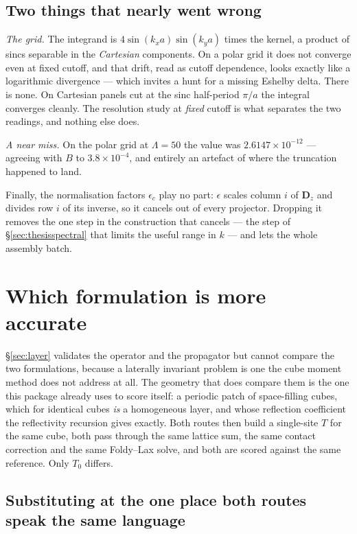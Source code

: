 \documentclass[11pt,a4paper]{article}
\begin{document}
\subsection{Two things that nearly went wrong}

\emph{The grid.}  The integrand is $4\sin(k_xa)\sin(k_ya)$ times the kernel, a
product of sincs separable in the \emph{Cartesian} components.  On a polar grid
it does not converge even at fixed cutoff, and that drift, read as cutoff
dependence, looks exactly like a logarithmic divergence --- which invites a hunt
for a missing Eshelby delta.  There is none.  On Cartesian panels cut at the sinc
half-period $\pi/a$ the integral converges cleanly.  The resolution study at
\emph{fixed} cutoff is what separates the two readings, and nothing else does.

\emph{A near miss.}  On the polar grid at $\Lambda = 50$ the value was
$2.6147\times10^{-12}$ --- agreeing with $B$ to $3.8\times10^{-4}$, and entirely
an artefact of where the truncation happened to land.

Finally, the normalisation factors $\epsilon_c$ play no part: $\epsilon$ scales
column $i$ of $\mathbf{D}_z$ and divides row $i$ of its inverse, so it cancels out
of every projector.  Dropping it removes the one step in the construction that
cancels --- the step of \S\ref{sec:thesisspectral} that limits the useful range in
$k$ --- and lets the whole assembly batch.

\section{Which formulation is more accurate}\label{sec:whichbetter}

\S\ref{sec:layer} validates the operator and the propagator but cannot compare
the two formulations, because a laterally invariant problem is one the cube
moment method does not address at all.  The geometry that does compare them is
the one this package already uses to score itself: a periodic patch of
space-filling cubes, which for identical cubes \emph{is} a homogeneous layer, and
whose reflection coefficient the reflectivity recursion gives exactly.  Both
routes then build a single-site $T$ for the same cube, both pass through the same
lattice sum, the same contact correction and the same Foldy--Lax \cite{foldy1945,lax1951} solve, and both
are scored against the same reference.  Only $T_0$ differs.

\subsection{Substituting at the one place both routes speak the same language}
\end{document}
